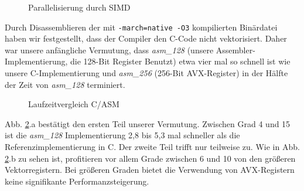 \documentclass[course=erap]{aspdoc}
\begin{document}
\begin{figure}[h] 
    \centering
    \caption{Parallelisierung durch SIMD}%
    \label{fig:SIMD}%
\end{figure}

Durch Disassemblieren der mit \texttt{-march=native -O3} kompilierten Binärdatei haben wir festgestellt, dass der Compiler den C-Code nicht vektorisiert. Daher war unsere anfängliche Vermutung, dass \textit{asm\_128} (unsere Assembler-Implementierung, die 128-Bit Register Benutzt) etwa vier mal so schnell ist wie unsere C-Implementierung und \textit{asm\_256} (256-Bit AVX-Register) in der Hälfte der Zeit von \textit{asm\_128} terminiert.

\begin{figure}[h] 
    \centering
    \qquad
    \caption{Laufzeitvergleich C/ASM}%
    \label{fig:Laufzeitvergleich Speedup}%
 \end{figure}
 
 Abb. \ref{fig:Laufzeitvergleich Speedup}.a bestätigt den ersten Teil unserer Vermutung. Zwischen Grad 4 und 15 ist die \textit{asm\_128} Implementierung 2,8 bis 5,3 mal schneller als die Referenzimplementierung in C. Der zweite Teil trifft nur teilweise zu. Wie in Abb. \ref{fig:Laufzeitvergleich Speedup}.b zu sehen ist, profitieren vor allem Grade zwischen 6 und 10 von den größeren Vektorregistern. Bei größeren Graden bietet die Verwendung von AVX-Registern keine signifikante Performanzsteigerung.
 \FloatBarrier
\end{document}

